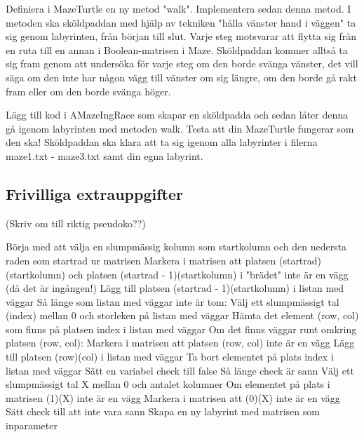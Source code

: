 \Subtask Definiera i MazeTurtle en ny metod "walk". Implementera sedan denna metod. I metoden ska sköldpaddan med hjälp av tekniken "hålla vänster hand i väggen" ta sig genom labyrinten, från början till slut. Varje steg motsvarar att flytta sig från en ruta till en annan i Boolean-matrisen i Maze. Sköldpaddan kommer alltså ta sig fram genom att undersöka för varje steg om den borde svänga vänster, det vill säga om den inte har någon vägg till vänster om sig längre, om den borde gå rakt fram eller om den borde svänga höger.

\Subtask Lägg till kod i AMazeIngRace som skapar en sköldpadda och sedan låter denna gå igenom labyrinten med metoden walk. Testa att din MazeTurtle fungerar som den ska! Sköldpaddan ska klara att ta sig igenom alla labyrinter i filerna maze1.txt - maze3.txt samt din egna labyrint.

\subsection{Frivilliga extrauppgifter}

(Skriv om till riktig pseudoko??)

Börja med att välja en slumpmässig kolumn som startkolumn och den nedersta raden som startrad ur matrisen
Markera i matrisen att platsen (startrad)(startkolumn) och platsen (startrad - 1)(startkolumn) i "brädet" inte är en vägg (då det är ingången!)
Lägg till platsen (startrad - 1)(startkolumn) i listan med väggar
Så länge som listan med väggar inte är tom:
    Välj ett slumpmässigt tal (index) mellan 0 och storleken på listan med väggar
    Hämta det element (row, col) som finns på platsen index i listan med väggar
    Om det finns väggar runt omkring platsen (row, col):
        Markera i matrisen att platsen (row, col) inte är en vägg
        Lägg till platsen (row)(col) i listan med väggar
    Ta bort elementet på plats index i listan med väggar
Sätt en variabel check till false
Så länge check är sann
    Välj ett slumpmässigt tal X mellan 0 och antalet kolumner
    Om elementet på plats i matrisen (1)(X) inte är en vägg
        Markera i matrisen att (0)(X) inte är en vägg
        Sätt check till att inte vara sann
Skapa en ny labyrint med matrisen som inparameter




